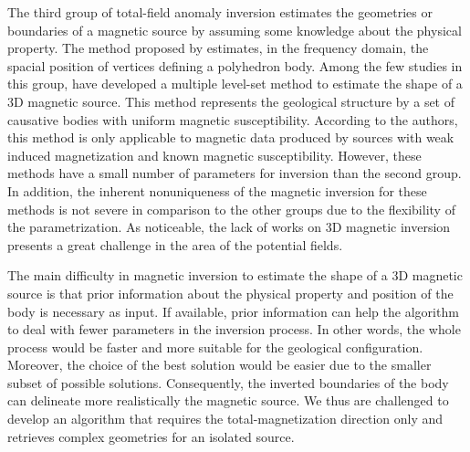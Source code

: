 The third group of total-field anomaly inversion estimates the geometries or boundaries of a magnetic source by assuming some knowledge about the physical property. The method proposed by \cite{wang_inversion_1990} estimates, in the frequency domain, the spacial position of vertices defining a polyhedron body.  Among the few studies in this group, \cite{wenbin-2017} have developed a multiple level-set method to estimate the shape of a 3D magnetic source. This method represents the geological structure by a set of causative bodies with uniform magnetic susceptibility. According to the authors, this method is only applicable to magnetic data produced by sources with weak induced magnetization and known magnetic susceptibility. However, these methods have a small number of parameters for inversion than the second group. In addition, the inherent nonuniqueness of the magnetic inversion for these methods is not severe in comparison to the other groups due to the flexibility of the parametrization. As noticeable, the lack of works on 3D magnetic inversion presents a great challenge in the area of the potential fields.

The main difficulty in magnetic inversion to estimate the shape of a 3D magnetic source is that prior information about the physical property and position of the body is necessary as input. If available, prior information can help the algorithm to deal with fewer parameters in the inversion process. In other words, the whole process would be faster and more suitable for the geological configuration. Moreover, the choice of the best solution would be easier due to the smaller subset of possible solutions. Consequently, the inverted boundaries of the body can delineate more realistically the magnetic source. We thus are challenged to develop an algorithm that requires the total-magnetization direction only and retrieves complex geometries for an isolated source.

